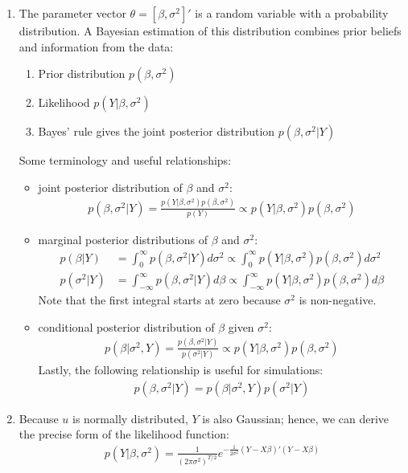\begin{enumerate}

\item The parameter vector \(\theta = [\beta,\sigma^2]'\) is a random variable with a probability distribution.
A Bayesian estimation of this distribution combines prior beliefs and information from the data:
\begin{enumerate}
\item Prior distribution \(p(\beta,\sigma^2)\)
\item Likelihood \(p(Y|\beta,\sigma^2)\)
\item Bayes' rule gives the joint posterior distribution \(p(\beta,\sigma^2|Y)\)
\end{enumerate}
Some terminology and useful relationships:
\begin{itemize}
\item joint posterior distribution of \(\beta \) and \(\sigma^2\):
\begin{align*}
p(\beta,\sigma^2|Y) = \frac{p(Y|\beta,\sigma^2) p(\beta,\sigma^2)}{p(Y)} \propto p(Y|\beta,\sigma^2) p(\beta,\sigma^2)
\end{align*}
\item marginal posterior distributions of \(\beta \) and \(\sigma^2\):
\begin{align*}
p(\beta|Y) &= \int_0^\infty p(\beta,\sigma^2|Y) d\sigma^2
\propto \int_0^\infty p(Y|\beta,\sigma^2) p(\beta,\sigma^2) d\sigma^2
\\
p(\sigma^2|Y) &= \int_{-\infty}^{\infty} p(\beta,\sigma^2|Y) d\beta
\propto \int_{-\infty}^{\infty} p(Y|\beta,\sigma^2) p(\beta,\sigma^2) d\beta
\end{align*}
Note that the first integral starts at zero because \(\sigma^2\) is non-negative.
\item conditional posterior distribution of \(\beta \) given \(\sigma^2\):
\begin{align*}
p(\beta|\sigma^2,Y) = \frac{p(\beta,\sigma^2|Y)}{p(\sigma^2|Y)}
\propto p(Y|\beta,\sigma^2) p(\beta,\sigma^2)
\end{align*}
Lastly, the following relationship is useful for simulations:
\begin{align*}
p(\beta,\sigma^2|Y) = p(\beta|\sigma^2,Y) p(\sigma^2|Y)
\end{align*}
\end{itemize}

\item Because \(u\) is normally distributed, \(Y\) is also Gaussian;
  hence, we can derive the precise form of the likelihood function:
\begin{align*}
p(Y|\beta,\sigma^2) = \frac{1}{{(2\pi \sigma^2)}^{T/2}} e^{-\frac{1}{2\sigma^2} (Y-X\beta)'(Y-X\beta)}
\end{align*}


\end{enumerate}
